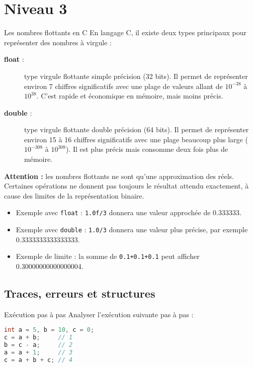 \section{Niveau 3}

\begin{UPSTIinfor}{Les nombres flottants en C}
En langage C, il existe deux types principaux pour représenter des nombres à virgule :
\begin{description}
    \item[\textbf{float} :] type virgule flottante simple précision (32 bits).  
    Il permet de représenter environ 7 chiffres significatifs avec une plage de valeurs allant de \(10^{-38}\) à \(10^{38}\).  
    C’est rapide et économique en mémoire, mais moins précis.

    \item[\textbf{double} :] type virgule flottante double précision (64 bits).  
    Il permet de représenter environ 15 à 16 chiffres significatifs avec une plage beaucoup plus large (\(10^{-308}\) à \(10^{308}\)).  
    Il est plus précis mais consomme deux fois plus de mémoire.
\end{description}
\textbf{Attention :} les nombres flottants ne sont qu’une approximation des réels. Certaines opérations ne donnent pas toujours le résultat attendu exactement, à cause des limites de la représentation binaire.
\begin{itemize}
    \item Exemple avec \texttt{float} : \verb|1.0f/3| donnera une valeur approchée de 0.333333.  
    \item Exemple avec \texttt{double} : \verb|1.0/3| donnera une valeur plus précise, par exemple 0.3333333333333333.  
    \item Exemple de limite : la somme de \verb|0.1+0.1+0.1| peut afficher 0.30000000000000004.
\end{itemize}
\end{UPSTIinfor}

\subsection{Traces, erreurs et structures}

\begin{UPSTIexercice}{Exécution pas à pas}
Analyser l'exécution suivante pas à pas :
\begin{lstlisting}[language=C]
int a = 5, b = 10, c = 0;
c = a + b;     // 1
b = c - a;     // 2
a = a + 1;     // 3
c = a + b + c; // 4
\end{lstlisting}
\end{UPSTIexercice}

